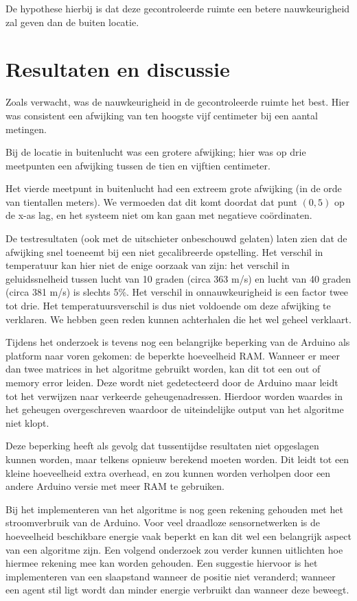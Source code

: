 \documentclass[a4paper,10pt]{article}
\begin{document}
De hypothese hierbij is dat deze gecontroleerde ruimte een betere nauwkeurigheid zal geven dan de buiten locatie.

\section{Resultaten en discussie}\label{sec:resultaten}
Zoals verwacht, was de nauwkeurigheid in de gecontroleerde ruimte het best. Hier was consistent een afwijking van ten hoogste vijf centimeter bij een aantal metingen.

Bij de locatie in buitenlucht was een grotere afwijking; hier was op drie meetpunten een afwijking tussen de tien en vijftien centimeter. 

Het vierde meetpunt in buitenlucht had een extreem grote afwijking (in de orde van tientallen meters). We vermoeden dat dit komt doordat dat punt $(0,5)$ op de x-as lag, en het systeem niet om kan gaan met negatieve co\"ordinaten.

De testresultaten (ook met de uitschieter onbeschouwd gelaten) laten zien dat de afwijking snel toeneemt bij een niet gecalibreerde opstelling. Het verschil in temperatuur kan hier niet de enige oorzaak van zijn: het verschil in geluidssnelheid tussen lucht van 10 graden (circa 363 m/s) en lucht van 40 graden (circa 381 m/s) is slechts 5\%. Het verschil in onnauwkeurigheid is een factor twee tot drie. Het temperatuursverschil is dus niet voldoende om deze afwijking te verklaren. We hebben geen reden kunnen achterhalen die het wel geheel verklaart.

Tijdens het onderzoek is tevens nog een belangrijke beperking van de Arduino als platform naar voren gekomen: de beperkte hoeveelheid RAM. Wanneer er meer dan twee matrices in het algoritme gebruikt worden, kan dit tot een out of memory error leiden. Deze wordt niet gedetecteerd door de Arduino maar leidt tot het verwijzen naar verkeerde geheugenadressen. Hierdoor worden waardes in het geheugen overgeschreven waardoor de uiteindelijke output van het algoritme niet klopt. 

Deze beperking heeft als gevolg dat tussentijdse resultaten niet opgeslagen kunnen worden, maar telkens opnieuw berekend moeten worden. Dit leidt tot een kleine hoeveelheid extra overhead, en zou kunnen worden verholpen door een andere Arduino versie met meer RAM te gebruiken.

Bij het implementeren van het algoritme is nog geen rekening gehouden met het stroomverbruik van de Arduino. Voor veel draadloze sensornetwerken is de hoeveelheid beschikbare energie vaak beperkt en kan dit wel een belangrijk aspect van een algoritme zijn. Een volgend onderzoek zou verder kunnen uitlichten hoe hiermee rekening mee kan worden gehouden. Een suggestie hiervoor is het implementeren van een slaapstand wanneer de positie niet veranderd; wanneer een agent stil ligt wordt dan minder energie verbruikt dan wanneer deze beweegt.
\end{document}
